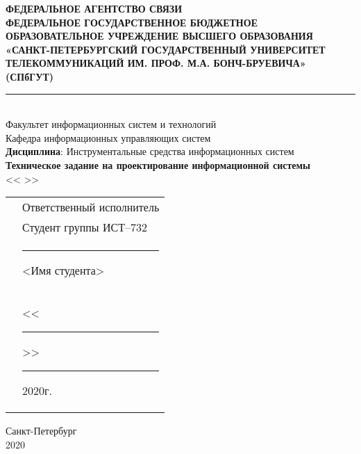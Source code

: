 \thispagestyle{empty}

\begin{center}
\small
\textbf{ФЕДЕРАЛЬНОЕ АГЕНТСТВО СВЯЗИ\\ \vspace{0.5em}
ФЕДЕРАЛЬНОЕ ГОСУДАРСТВЕННОЕ БЮДЖЕТНОЕ ОБРАЗОВАТЕЛЬНОЕ УЧРЕЖДЕНИЕ ВЫСШЕГО ОБРАЗОВАНИЯ\\
«САНКТ-ПЕТЕРБУРГСКИЙ ГОСУДАРСТВЕННЫЙ УНИВЕРСИТЕТ ТЕЛЕКОММУНИКАЦИЙ ИМ. ПРОФ. М.А. БОНЧ-БРУЕВИЧА»\\
(СПбГУТ)\\}
\normalsize
\vspace{-0.8em}
\rule{\linewidth}{1pt}\\
\vspace{4em}
Факультет информационных систем и технологий\\
Кафедра информационных управляющих систем\\
\vspace{4em}
\textbf{Дисциплина}: Инструментальные средства информационных систем\\
\vspace{4em}
\textbf{Техническое задание на проектирование информационной системы}\\
<< >>\\

\end{center}
\vspace{7em}

\begin{table}[H]
    \raggedleft{}
    \begin{tabular}{p{8cm}p{7cm}}
      & Ответственный исполнитель\\[-0.5em]
      & Студент группы ИСТ--732\\[-0.5em]
      & \hspace{0.6em}\rule{5em}{0.5pt} <Имя студента> \\[-0.5em]
      & <<\rule{1.5em}{0.5pt}>>\:{}\rule{6em}{0.5pt} 2020\:г. \\[-0.5em]
    \end{tabular}
\end{table}

\vfill

\begin{center}
    Санкт-Петербург\\2020
\end{center}

\clearpage
